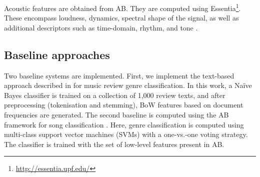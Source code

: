 Acoustic features are obtained from AB. They are computed using Essentia\footnote{\url{http://essentia.upf.edu/}}. These encompass loudness, dynamics, spectral shape of the signal, as well as additional descriptors such as time-domain, rhythm, and tone \cite{Porter2015}.%



\subsection{Baseline approaches}
\label{sec:baselines}
Two baseline systems are implemented. First, we implement the text-based approach described in \cite{Hu2005} for music review genre classification. In this work, a Na\"{i}ve Bayes classifier is trained on a collection of 1,000 review texts, and after preprocessing (tokenisation and stemming), BoW features based on document frequencies are generated.
The second baseline is computed using the AB framework for song classification \cite{Porter2015}. Here, genre classification is computed using  multi-class support vector machines (SVMs) with a one-vs.-one voting strategy. The classifier is trained with the set of low-level features present in AB. %

